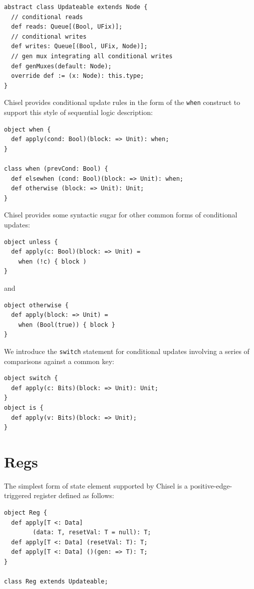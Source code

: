 \documentclass[10pt,twocolumn]{article}
\def\code#1{{\small\tt #1}}
\begin{document}
\begin{lstlisting}
abstract class Updateable extends Node {
  // conditional reads
  def reads: Queue[(Bool, UFix)];
  // conditional writes
  def writes: Queue[(Bool, UFix, Node)];
  // gen mux integrating all conditional writes
  def genMuxes(default: Node);
  override def := (x: Node): this.type;
}
\end{lstlisting}

Chisel provides conditional update rules
in the form of the \code{when} construct to support this style of
sequential logic description:
 
\begin{lstlisting}
object when {
  def apply(cond: Bool)(block: => Unit): when;
}

class when (prevCond: Bool) {
  def elsewhen (cond: Bool)(block: => Unit): when;
  def otherwise (block: => Unit): Unit;
}
\end{lstlisting}


Chisel provides some syntactic sugar for other common forms of
conditional updates:

\begin{lstlisting}
object unless {
  def apply(c: Bool)(block: => Unit) = 
    when (!c) { block )
}
\end{lstlisting}

\noindent 
and

\begin{lstlisting}
object otherwise {
  def apply(block: => Unit) = 
    when (Bool(true)) { block }
}
\end{lstlisting}

We introduce the \code{switch} statement for conditional updates
involving a series of comparisons against a common key:

\begin{lstlisting}
object switch {
  def apply(c: Bits)(block: => Unit): Unit;
}
object is {
  def apply(v: Bits)(block: => Unit);
}
\end{lstlisting}

\section{Regs}

The simplest form of state element supported by Chisel is a
positive-edge-triggered register defined as follows:

\begin{lstlisting}
object Reg {
  def apply[T <: Data]
        (data: T, resetVal: T = null): T;
  def apply[T <: Data] (resetVal: T): T;
  def apply[T <: Data] ()(gen: => T): T;
}
 
class Reg extends Updateable;
\end{lstlisting}
\end{document}
